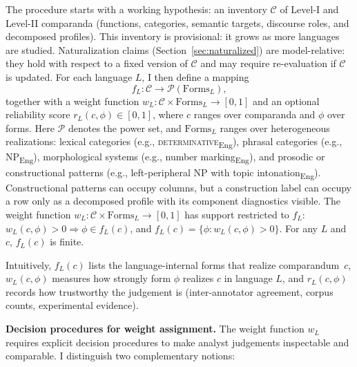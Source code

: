 \documentclass[12pt]{article}
\begin{document}
The procedure starts with a working hypothesis: an inventory $\mathcal{C}$ of Level-I and Level-II comparanda (functions, categories, semantic targets, discourse roles, and decomposed profiles). This inventory is provisional: it grows as more languages are studied. Naturalization claims (Section~\ref{sec:naturalized}) are model-relative: they hold with respect to a fixed version of $\mathcal{C}$ and may require re-evaluation if $\mathcal{C}$ is updated. For each language $L$, I then define a mapping
\[
  f_L : \mathcal{C} \rightarrow \mathcal{P}(\mathrm{Forms}_L),
\]
together with a weight function $w_L : \mathcal{C} \times \mathrm{Forms}_L \to [0,1]$ and an optional reliability score $r_L(c, \phi) \in [0,1]$, where $c$ ranges over comparanda and $\phi$ over forms. Here $\mathcal{P}$ denotes the power set, and $\mathrm{Forms}_L$ ranges over heterogeneous realizations: lexical categories (e.g., \textsc{determinative}\textsubscript{Eng}), phrasal categories (e.g., \textsc{NP}\textsubscript{Eng}), morphological systems (e.g., number marking\textsubscript{Eng}), and prosodic or constructional patterns (e.g., left-peripheral NP with topic intonation\textsubscript{Eng}). Constructional patterns can occupy columns, but a construction label can occupy a row only as a decomposed profile with its component diagnostics visible. The weight function $w_L : \mathcal{C} \times \mathrm{Forms}_L \to [0,1]$ has support restricted to $f_L$: $w_L(c,\phi) > 0 \Rightarrow \phi \in f_L(c)$, and $f_L(c) = \{\phi : w_L(c,\phi) > 0\}$. For any $L$ and $c$, $f_L(c)$ is finite.

Intuitively, $f_L(c)$ lists the language-internal forms that realize comparandum~$c$, $w_L(c, \phi)$ measures how strongly form $\phi$ realizes $c$ in language $L$, and $r_L(c, \phi)$ records how trustworthy the judgement is (inter-annotator agreement, corpus counts, experimental evidence).

\textbf{Decision procedures for weight assignment.}\label{subsec:weight-procedures} The weight function $w_L$ requires explicit decision procedures to make analyst judgements inspectable and comparable. I distinguish two complementary notions:
\end{document}
